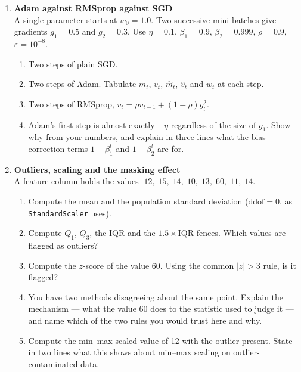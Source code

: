 \documentclass[11pt,a4paper]{article}
\begin{document}
\begin{enumerate}[label=\textbf{B\arabic*.}, leftmargin=*]
  \item \textbf{Adam against RMSprop against SGD} \\
    A single parameter starts at $w_0 = 1.0$. Two successive mini-batches give
    gradients $g_1 = 0.5$ and $g_2 = 0.3$. Use $\eta = 0.1$,
    $\beta_1 = 0.9$, $\beta_2 = 0.999$, $\rho = 0.9$, $\varepsilon = 10^{-8}$.
    \begin{enumerate}[label=(\alph*), leftmargin=*]
      \item Two steps of plain SGD. 
      \item Two steps of Adam. Tabulate $m_t$, $v_t$, $\hat{m}_t$, $\hat{v}_t$
        and $w_t$ at each step. 
      \item Two steps of RMSprop, $v_t = \rho v_{t-1} + (1-\rho)g_t^2$. 
      \item Adam's first step is almost exactly $-\eta$ regardless of the size
        of $g_1$. Show why from your numbers, and explain in three lines what
        the bias-correction terms $1-\beta_1^t$ and $1-\beta_2^t$ are for.
    \end{enumerate}

  \item \textbf{Outliers, scaling and the masking effect} \\
    A feature column holds the values
    $\;12,\;15,\;14,\;10,\;13,\;60,\;11,\;14$.
    \begin{enumerate}[label=(\alph*), leftmargin=*]
      \item Compute the mean and the population standard deviation
        ($\text{ddof}=0$, as \texttt{StandardScaler} uses). 
      \item Compute $Q_1$, $Q_3$, the IQR and the $1.5 \times \text{IQR}$
        fences. Which values are flagged as outliers? 
      \item Compute the $z$-score of the value 60. Using the common
        $|z| > 3$ rule, is it flagged? 
      \item You have two methods disagreeing about the same point. Explain the
        mechanism --- what the value 60 does to the statistic used to judge it
        --- and name which of the two rules you would trust here and why.
      \item Compute the min--max scaled value of 12 with the outlier present.
        State in two lines what this shows about min--max scaling on
        outlier-contaminated data. 
    \end{enumerate}


\end{enumerate}
\end{document}
